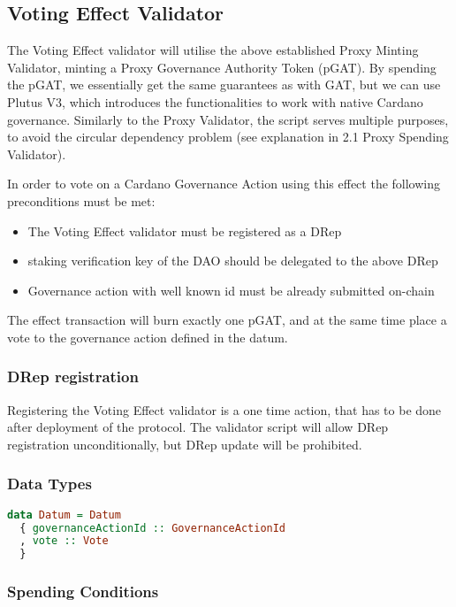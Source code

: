 \documentclass{article}
\begin{document}
\subsection{Voting Effect Validator}

The Voting Effect validator will utilise the above established Proxy Minting Validator, minting a Proxy Governance Authority Token (pGAT).
By spending the pGAT, we essentially get the same guarantees as with GAT, but we can use Plutus V3, which introduces the functionalities to work with native Cardano governance.
Similarly to the Proxy Validator, the script serves multiple purposes, to avoid the circular dependency problem (see explanation in 2.1 Proxy Spending Validator).

In order to vote on a Cardano Governance Action using this effect the following preconditions must be met:
\begin{itemize}
  \item The Voting Effect validator must be registered as a DRep
  \item staking verification key of the DAO should be delegated to the above DRep
  \item Governance action with well known id must be already submitted on-chain
\end{itemize}

The effect transaction will burn exactly one pGAT, and at the same time place a vote to the governance action defined in the datum.

\subsubsection*{DRep registration}

Registering the Voting Effect validator is a one time action, that has to be done after deployment of the protocol.
The validator script will allow DRep registration unconditionally, but DRep update will be prohibited.

\subsubsection*{Data Types}

\begin{lstlisting}[language=Haskell]
data Datum = Datum
  { governanceActionId :: GovernanceActionId
  , vote :: Vote
  }
\end{lstlisting}

\subsubsection*{Spending Conditions}
\end{document}
